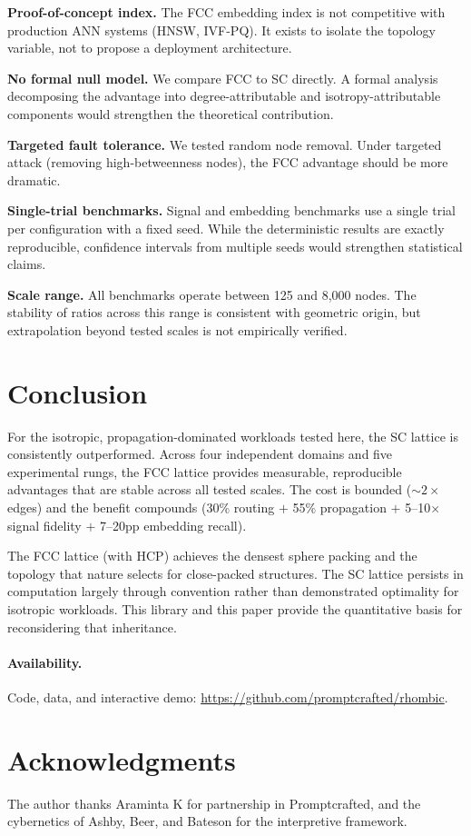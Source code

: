 \documentclass[11pt]{article}
\begin{document}
\textbf{Proof-of-concept index.} The FCC embedding index is not
competitive with production ANN systems (HNSW, IVF-PQ). It exists
to isolate the topology variable, not to propose a deployment
architecture.

\textbf{No formal null model.} We compare FCC to SC directly. A
formal analysis decomposing the advantage into degree-attributable
and isotropy-attributable components would strengthen the
theoretical contribution.

\textbf{Targeted fault tolerance.} We tested random node removal.
Under targeted attack (removing high-betweenness nodes), the FCC
advantage should be more dramatic.

\textbf{Single-trial benchmarks.} Signal and embedding benchmarks
use a single trial per configuration with a fixed seed. While the
deterministic results are exactly reproducible, confidence
intervals from multiple seeds would strengthen statistical claims.

\textbf{Scale range.} All benchmarks operate between 125 and
8{,}000 nodes. The stability of ratios across this range is
consistent with geometric origin, but extrapolation beyond tested
scales is not empirically verified.

\section{Conclusion}
\label{sec:conclusion}

For the isotropic, propagation-dominated workloads tested here, the
SC lattice is consistently outperformed. Across four independent
domains and five experimental rungs, the FCC lattice provides
measurable, reproducible advantages that are stable across all
tested scales. The cost is bounded (${\sim}2\times$ edges) and
the benefit compounds (30\% routing $+$ 55\% propagation $+$
5--10$\times$ signal fidelity $+$ 7--20pp embedding recall).

The FCC lattice (with HCP) achieves the densest sphere packing and
the topology that nature selects for close-packed structures. The SC
lattice persists in computation largely through convention rather than
demonstrated optimality for isotropic workloads. This
library and this paper provide the quantitative basis for
reconsidering that inheritance.

\paragraph{Availability.}
Code, data, and interactive demo:
\url{https://github.com/promptcrafted/rhombic}.

\section*{Acknowledgments}

The author thanks Araminta K for partnership in Promptcrafted, and
the cybernetics of Ashby, Beer, and Bateson for the interpretive
framework.



\end{document}
